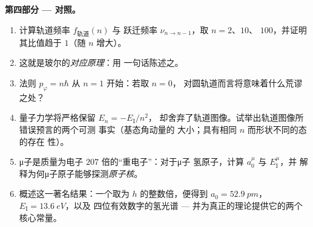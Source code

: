 \begin{problem}
\medskip\noindent\textbf{第四部分 --- 对照。}
\begin{enumerate}[resume]
  \item 计算轨道频率 $f_{\text{轨道}}(n)$ 与
        跃迁频率 $\nu_{n \to n-1}$，取 $n = 2$、$10$、
        $100$，并证明其比值趋于 $1$（随 $n$ 增大）。
  \item 这就是玻尔的\emph{对应原理}：用
        一句话陈述之。
  \item 法则 $p_\varphi = n\hbar$ 从 $n = 1$ 开始：若取 $n = 0$，
        对圆轨道而言将意味着什么荒谬之处？
  \item 量子力学将严格保留 $E_n = -E_{\text{I}}/n^2$，
        却舍弃了轨道图像。试举出轨道图像所错误预言的两个可测
        事实（基态角动量的
        大小；具有相同 $n$ 而形状不同的态的存在
        性）。
  \item μ子是质量为电子 $207$ 倍的“重电子”：对于μ子
        氢原子，计算 $a_0^\mu$ 与 $E_{\text{I}}^\mu$，并
        解释为何μ子原子能够探测\emph{原子核}。
  \item 概述这一著名结果：一个取为
        $h$ 的整数倍，便得到 $a_0 = \qty{52.9}{pm}$，
        $E_{\text{I}} = \qty{13.6}{eV}$，以及
        四位有效数字的氢光谱 --- 并为真正的理论提供它的两个
        核心常量。
\end{enumerate}
\end{problem}
